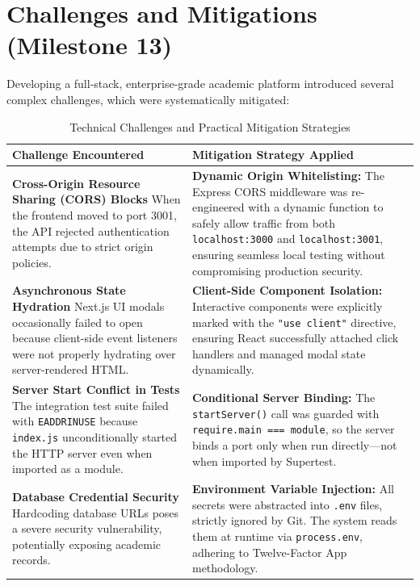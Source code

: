 \documentclass[12pt, a4paper]{report}
\begin{document}
\section{Challenges and Mitigations (Milestone 13)}
Developing a full-stack, enterprise-grade academic platform introduced several complex challenges, which were systematically mitigated:

\begin{table}[H]
\centering
\caption{Technical Challenges and Practical Mitigation Strategies}
\begin{tabular}{p{4.5cm} p{10cm}}
\toprule
\textbf{Challenge Encountered} & \textbf{Mitigation Strategy Applied} \\
\midrule
\textbf{Cross-Origin Resource Sharing (CORS) Blocks} \newline When the frontend moved to port 3001, the API rejected authentication attempts due to strict origin policies. & \textbf{Dynamic Origin Whitelisting:} The Express CORS middleware was re-engineered with a dynamic function to safely allow traffic from both \texttt{localhost:3000} and \texttt{localhost:3001}, ensuring seamless local testing without compromising production security. \\
\addlinespace
\textbf{Asynchronous State Hydration} \newline Next.js UI modals occasionally failed to open because client-side event listeners were not properly hydrating over server-rendered HTML. & \textbf{Client-Side Component Isolation:} Interactive components were explicitly marked with the \texttt{"use client"} directive, ensuring React successfully attached click handlers and managed modal state dynamically. \\
\addlinespace
\textbf{Server Start Conflict in Tests} \newline The integration test suite failed with \texttt{EADDRINUSE} because \texttt{index.js} unconditionally started the HTTP server even when imported as a module. & \textbf{Conditional Server Binding:} The \texttt{startServer()} call was guarded with \texttt{require.main === module}, so the server binds a port only when run directly---not when imported by Supertest. \\
\addlinespace
\textbf{Database Credential Security} \newline Hardcoding database URLs poses a severe security vulnerability, potentially exposing academic records. & \textbf{Environment Variable Injection:} All secrets were abstracted into \texttt{.env} files, strictly ignored by Git. The system reads them at runtime via \texttt{process.env}, adhering to Twelve-Factor App methodology. \\
\bottomrule
\end{tabular}
\end{table}
\end{document}
